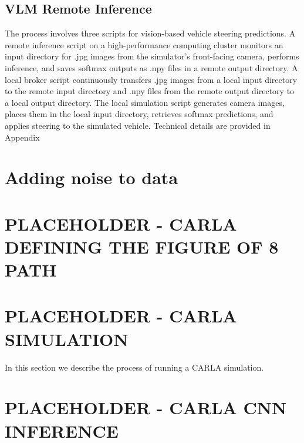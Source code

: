 \subsection{VLM Remote Inference}
The process involves three scripts for vision-based vehicle steering predictions. A remote inference script on a high-performance computing cluster monitors an input directory for .jpg images from the simulator’s front-facing camera, performs inference, and saves softmax outputs as .npy files in a remote output directory. A local broker script continuously transfers .jpg images from a local input directory to the remote input directory and .npy files from the remote output directory to a local output directory. The local simulation script generates camera images, places them in the local input directory, retrieves softmax predictions, and applies steering to the simulated vehicle. Technical details are provided in Appendix %


\section{Adding noise to data}
\section{PLACEHOLDER - CARLA DEFINING THE FIGURE OF 8 PATH}

\section{PLACEHOLDER - CARLA SIMULATION}
\label{methods:generic_carla_simulation}
In this section we describe the process of running a CARLA simulation.

\section{PLACEHOLDER - CARLA CNN INFERENCE}

